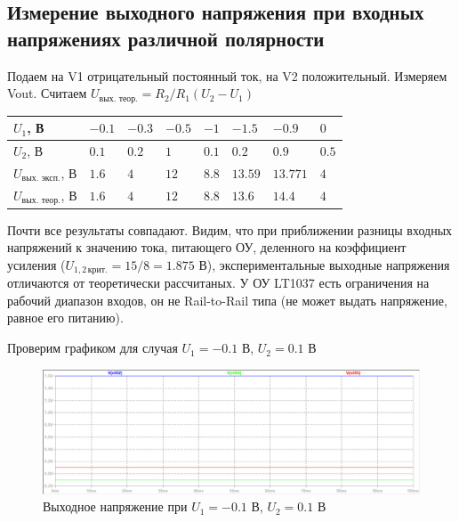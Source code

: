 \documentclass[a4paper, 12pt]{article}
\begin{document}
    \subsection{Измерение выходного напряжения при входных напряжениях различной полярности}
    Подаем на V1 отрицательный постоянный ток, на V2 положительный. Измеряем Vout. Считаем
    $U_{\text{вых. теор.}}=R_2/R_1\left( U_2-U_1 \right)$
    \begin{center}
        \begin{tabular}{ | m{6em} | m{3em}| m{3em} | m{3em} | m{3em} | m{3em} | m{3em} | m{3em} | } 
        \hline
        $U_1$, В& $-0.1$ &$-0.3$ &$-0.5$ &$-1$& $-1.5$ & $-0.9$ &$0$\\ 
        \hline
        $U_2$, В& $0.1$ &$0.2$ &$1$ &$0.1$& $0.2$ & $0.9$ &$0.5$\\ 
        \hline
        $U_{\text{вых. эксп.}}$, В& $1.6$ &$4$ &$12$ &$8.8$& $13.59$ & $13.771$ &$4$\\
        \hline
        $U_{\text{вых. теор.}}$, В& $1.6$ &$4$ &$12$ &$8.8$& $13.6$ & $14.4$ &$4$\\
        \hline
        \end{tabular}
    \end{center}
    Почти все результаты совпадают. Видим, что при приближении разницы входных напряжений к значению
    тока, питающего ОУ, деленного на коэффициент усиления ($U_{1,2\,\text{крит.}}=15/8=1.875$ В),
    экспериментальные выходные напряжения отличаются от
    теоретически рассчитаных. У ОУ LT1037 есть ограничения на рабочий диапазон входов,
    он не Rail-to-Rail типа (не может выдать напряжение, равное его питанию).


    Проверим графиком для случая $U_1=-0.1$ В, $U_2=0.1$ В
    \begin{figure}[H]
        \centering
        \includegraphics[scale=0.46]{1task_check.png}
        \captionsetup{skip=0pt}
        \caption{Выходное напряжение при $U_1=-0.1$ В, $U_2=0.1$ В}
        \label{fig:1task_check}
    \end{figure}
\end{document}
